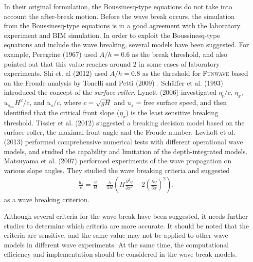 \documentclass[review]{elsarticle}
\begin{document}
In their original formulation, 
the Boussinesq-type equations do not take into account 
the after-break motion.
Before the wave break occurs, 
the simulation from the Boussinesq-type equations is
in a good agreement with the laboratory experiment and BIM simulation.
In order to exploit the Boussinesq-type equations
and include the wave breaking,
several models have been suggested. 
For example, 
Peregrine (1967) \citep{peregrine1967long} used $A/h=0.6$ 
as the break threshold, and also pointed out that
this value reaches around $2$ in some cases of laboratory experiments. 
Shi et. al (2012) \citep{shi2012high} used 
$A/h = 0.8$ as the threshold 
for \textsc{Funwave} based on the Froude analysis 
by Tonelli and Petti (2009) \citep{tonelli2009hybrid}.
Sch{\"a}ffer et al. (1993) \cite{schaffer1993boussinesq} 
introduced the concept of the {\em surface roller}.
Lynett (2006) \cite{lynett2006nearshore} 
investigated $\eta_t/c$, $\eta_x$, $u_{s_{xx}} H^2/c$, and $u_s/c$, 
where $c=\sqrt{gH}$ and $u_s$ = free surface speed,
and then identified that the critical front slope ($\eta_x$) 
is the least sensitive breaking threshold. 
Tissier et al. (2012) \cite{tissier2012new} suggested
a breaking decision model based on the surface roller,
the maximal front angle and the Froude number.
L{\o}vholt et al. (2013) performed comprehensive numerical tests
with different operational wave models, 
and studied the capability and limitation of 
the depth-integrated models. 
Matsuyama et al. (2007) \cite{matsuyama2007study} performed experiments
of the wave propagation on various slope angles. 
They studied the wave breaking criteria and suggested 
\begin{align*}
\frac{u_s}{c} = \frac{\eta}{H} - \frac{h}{3H}
\left(
H\frac{\partial^2 \eta}{\partial x^2} - 2 \left(\frac{\partial \eta}{\partial x} \right)^2
\right),
\end{align*}
as a wave breaking criterion.

Although several criteria for the wave break have been suggested,
it needs further studies to determine which criteria are more accurate.
It should be noted 
that the criteria are sensitive, and 
the same value may not be applied 
to other wave models in different wave experiments.
At the same time, the computational efficiency and implementation
should be considered in the wave break models. 
\end{document}
